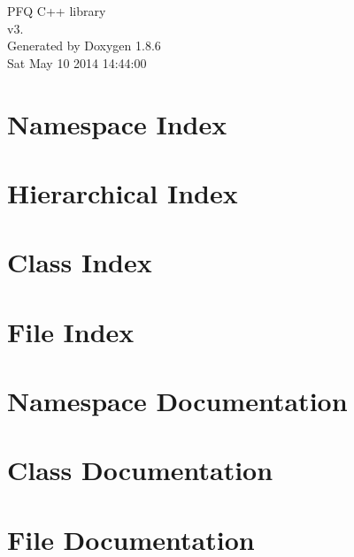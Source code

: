 \documentclass[twoside]{book}
\newcommand{\clearemptydoublepage}{%
  \newpage{\pagestyle{empty}\cleardoublepage}%
}
\begin{document}
\hypersetup{pageanchor=false}
\begin{titlepage}
\vspace*{7cm}
\begin{center}%
{\Large P\-F\-Q C++ library \\[1ex]\large v3. }\\
\vspace*{1cm}
{\large Generated by Doxygen 1.8.6}\\
\vspace*{0.5cm}
{\small Sat May 10 2014 14:44:00}\\
\end{center}
\end{titlepage}
\clearemptydoublepage
\tableofcontents
\clearemptydoublepage
{}
\hypersetup{pageanchor=true}

\chapter{Namespace Index}

\chapter{Hierarchical Index}

\chapter{Class Index}

\chapter{File Index}

\chapter{Namespace Documentation}



\chapter{Class Documentation}

















\chapter{File Documentation}





\newpage
{}
{}
\printindex
\end{document}

